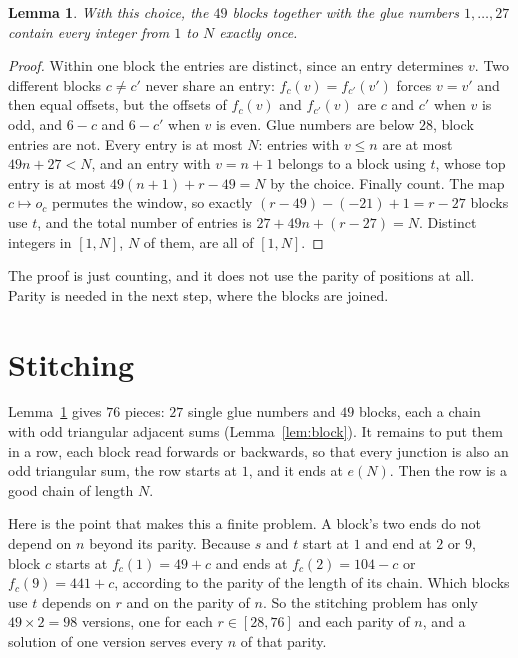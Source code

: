 \documentclass[11pt]{article}
\newtheorem{lemma}[theorem]{Lemma}
\theoremstyle{definition}
\theoremstyle{remark}
\begin{document}
\begin{lemma}\label{lem:cover}
With this choice, the $49$ blocks together with the glue numbers $1,\dots,27$ contain every integer
from $1$ to $N$ exactly once.
\end{lemma}

\begin{proof}
Within one block the entries are distinct, since an entry determines $v$. Two different blocks
$c\ne c'$ never share an entry: $f_c(v)=f_{c'}(v')$ forces $v=v'$ and then equal offsets, but the
offsets of $f_c(v)$ and $f_{c'}(v)$ are $c$ and $c'$ when $v$ is odd, and $6-c$ and $6-c'$ when $v$
is even. Glue numbers are below $28$, block entries are not. Every entry is at most $N$: entries
with $v\le n$ are at most $49n+27<N$, and an entry with $v=n+1$ belongs to a block using $t$, whose
top entry is at most $49(n+1)+r-49=N$ by the choice. Finally count. The map $c\mapsto o_c$ permutes
the window, so exactly $(r-49)-(-21)+1=r-27$ blocks use $t$, and the total number of entries is
$27+49n+(r-27)=N$. Distinct integers in $[1,N]$, $N$ of them, are all of $[1,N]$.
\end{proof}

The proof is just counting, and it does not use the parity of positions at all. Parity is needed
in the next step, where the blocks are joined.

\section{Stitching}

Lemma~\ref{lem:cover} gives $76$ pieces: $27$ single glue numbers and $49$ blocks, each a chain
with odd triangular adjacent sums (Lemma~\ref{lem:block}). It remains to put them in a row, each
block read forwards or backwards, so that every junction is also an odd triangular sum, the row
starts at $1$, and it ends at $e(N)$. Then the row is a good chain of length $N$.

Here is the point that makes this a finite problem. A block's two ends do not depend on $n$
beyond its parity. Because $s$ and $t$ start at $1$ and end at $2$ or $9$, block $c$ starts at
$f_c(1)=49+c$ and ends at $f_c(2)=104-c$ or $f_c(9)=441+c$, according to the parity of the
length of its chain. Which blocks use $t$ depends on $r$ and on the parity of $n$. So the
stitching problem has only $49\times2=98$ versions, one for each $r\in[28,76]$ and each parity of
$n$, and a solution of one version serves every $n$ of that parity.
\end{document}
